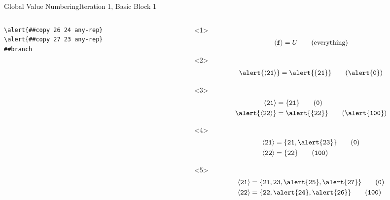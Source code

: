 \documentclass{beamer}
\newcommand{\vn}[1]{\ensuremath{\langle\texttt{#1}\rangle}}
\newcommand{\vreg}[1]{\texttt{#1}}
\begin{document}
\begin{frame}[fragile]{Global Value Numbering}{Iteration 1, Basic Block 1}
\begin{columns}[t,onlytextwidth]
\begin{column}[t]{.5\textwidth}
\begin{onlyenv}
\begin{Verbatim}[frame=single,commandchars=\\\{\}]
\alert{##copy 26 24 any-rep}
\alert{##copy 27 23 any-rep}
##branch
        \end{Verbatim}
      \end{onlyenv}
    \end{column}
    \begin{column}{.5\textwidth}
      \begin{onlyenv}<1>
        \begin{align*}
          \vn{\textbf{f}} &= U \tag{everything} \\
        \end{align*}
      \end{onlyenv}
      \begin{onlyenv}<2>
        \begin{align*}
          \alert{\vn{21}} &= \alert{\{\vreg{21}\}} \tag{\alert{\texttt{0}}} \\
        \end{align*}
      \end{onlyenv}
      \begin{onlyenv}<3>
        \begin{align*}
          \vn{21} &= \{\vreg{21}\} \tag{\texttt{0}}   \\
          \alert{\vn{22}} &= \alert{\{\vreg{22}\}} \tag{\alert{\texttt{100}}} \\
        \end{align*}
      \end{onlyenv}
      \begin{onlyenv}<4>
        \begin{align*}
          \vn{21} &= \{\vreg{21},\alert{\vreg{23}}\} \tag{\texttt{0}}   \\
          \vn{22} &= \{\vreg{22}\}           \tag{\texttt{100}} \\
        \end{align*}
      \end{onlyenv}
      \begin{onlyenv}<5>
        \begin{align*}
          \vn{21} &= \{\vreg{21}, \vreg{23}, \alert{\vreg{25}}, \alert{\vreg{27}}\} \tag{\texttt{0}}   \\
          \vn{22} &= \{\vreg{22}, \alert{\vreg{24}}, \alert{\vreg{26}}\}            \tag{\texttt{100}} \\
        \end{align*}
      \end{onlyenv}
    \end{column}
  \end{columns}
\end{frame}
\end{document}
